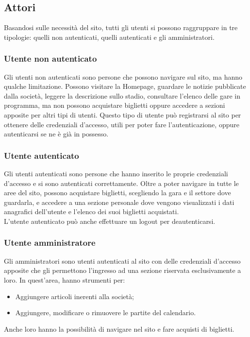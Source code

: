     \subsection{Attori}
    Basandosi sulle necessità del sito, tutti gli utenti si possono raggruppare in tre tipologie: quelli non autenticati, quelli autenticati e gli amministratori.
    
        \subsubsection{Utente non autenticato}
        
        Gli utenti non autenticati sono persone che possono navigare sul sito, ma hanno qualche limitazione. Possono visitare la Homepage, guardare le notizie pubblicate dalla società, leggere la descrizione sullo stadio, consultare l'elenco delle gare in programma, ma non possono acquistare biglietti oppure accedere a sezioni apposite per altri tipi di utenti. Questo tipo di utente può registrarsi al sito per ottenere delle credenziali d'accesso, utili per poter fare l'autenticazione, oppure autenticarsi se ne è già in possesso.
        
        \subsubsection{Utente autenticato}
        
        Gli utenti autenticati sono persone che hanno inserito le proprie credenziali d'accesso e si sono autenticati correttamente. Oltre a poter navigare in tutte le aree del sito, possono acquistare biglietti, scegliendo la gara e il settore dove guardarla, e accedere a una sezione personale dove vengono visualizzati i dati anagrafici dell'utente e l'elenco dei suoi biglietti acquistati.\\ L'utente autenticato può anche effettuare un logout per deautenticarsi.
        
        \subsubsection{Utente amministratore}
        
        Gli amministratori sono utenti autenticati al sito con delle credenziali d'accesso apposite che gli permettono l'ingresso ad una sezione riservata esclusivamente a loro. In quest'area, hanno strumenti per:
        \begin{itemize}
            \item Aggiungere articoli inerenti alla società;
            \item Aggiungere, modificare o rimuovere le partite del calendario.
        \end{itemize}
        Anche loro hanno la possibilità di navigare nel sito e fare acquisti di biglietti.
        

